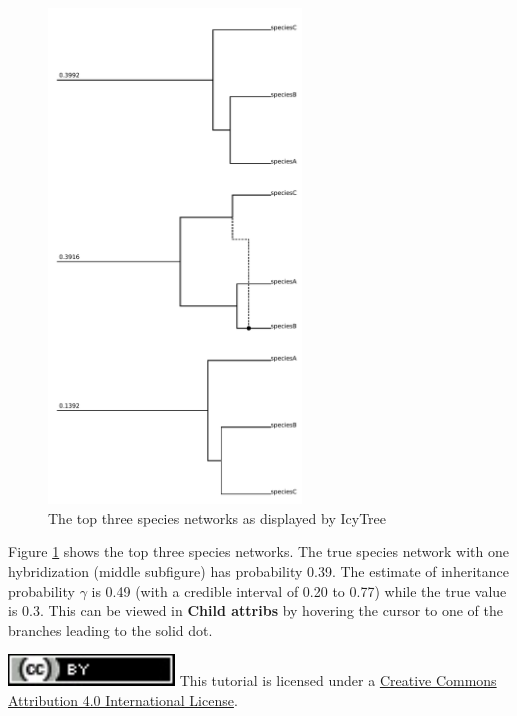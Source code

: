 \documentclass[11pt]{article}
\begin{document}
\begin{figure}[h]
\center
\includegraphics[width=0.6\textwidth]{figs/icytree.pdf}
\caption{The top three species networks as displayed by IcyTree}
\label{fig_networks}
\end{figure}

Figure \ref{fig_networks} shows the top three species networks. The true species network with one hybridization (middle subfigure) has probability 0.39. The estimate of inheritance probability $\gamma$ is 0.49 (with a credible interval of 0.20 to 0.77) while the true value is 0.3. This can be viewed in \textbf{Child attribs} by hovering the cursor to one of the branches leading to the solid dot.

\clearpage
\noindent \href{http://creativecommons.org/licenses/by/4.0/}{\includegraphics[scale=0.7]{figs/fig_ccby.pdf}} This tutorial is licensed under a \href{http://creativecommons.org/licenses/by/4.0/}{Creative Commons Attribution 4.0 International License}. 



\end{document}
